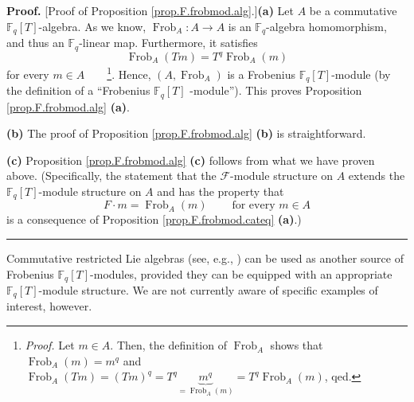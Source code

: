 \documentclass[numbers=enddot,12pt,final,onecolumn,notitlepage]{scrartcl}%
\theoremstyle{definition}
\newenvironment{proof}[1][Proof]{\noindent\textbf{#1.} }{\ \rule{0.5em}{0.5em}}
\begin{document}
\begin{proof}
[Proof of Proposition \ref{prop.F.frobmod.alg}.]\textbf{(a)} Let $A$ be a
commutative $\mathbb{F}_{q}\left[  T\right]  $-algebra. As we know,
$\operatorname*{Frob}\nolimits_{A}:A\rightarrow A$ is an $\mathbb{F}_{q}%
$-algebra homomorphism, and thus an $\mathbb{F}_{q}$-linear map. Furthermore,
it satisfies%
\[
\operatorname*{Frob}\nolimits_{A}\left(  Tm\right)  =T^{q}\operatorname*{Frob}%
\nolimits_{A}\left(  m\right)
\]
for every $m\in A$\ \ \ \ \footnote{\textit{Proof.} Let $m\in A$. Then, the
definition of $\operatorname*{Frob}\nolimits_{A}$ shows that
$\operatorname*{Frob}\nolimits_{A}\left(  m\right)  =m^{q}$ and
$\operatorname*{Frob}\nolimits_{A}\left(  Tm\right)  =\left(  Tm\right)
^{q}=T^{q}\underbrace{m^{q}}_{=\operatorname*{Frob}\nolimits_{A}\left(
m\right)  }=T^{q}\operatorname*{Frob}\nolimits_{A}\left(  m\right)  $, qed.}.
Hence, $\left(  A,\operatorname*{Frob}\nolimits_{A}\right)  $ is a Frobenius
$\mathbb{F}_{q}\left[  T\right]  $-module (by the definition of a
\textquotedblleft Frobenius $\mathbb{F}_{q}\left[  T\right]  $%
-module\textquotedblright). This proves Proposition \ref{prop.F.frobmod.alg}
\textbf{(a)}. \medskip

\textbf{(b)} The proof of Proposition \ref{prop.F.frobmod.alg} \textbf{(b)} is
straightforward. \medskip

\textbf{(c)} Proposition \ref{prop.F.frobmod.alg} \textbf{(c)} follows from
what we have proven above. (Specifically, the statement that the $\mathcal{F}%
$-module structure on $A$ extends the $\mathbb{F}_{q}\left[  T\right]
$-module structure on $A$ and has the property that
\[
F\cdot m=\operatorname*{Frob}\nolimits_{A}\left(  m\right)
\ \ \ \ \ \ \ \ \ \ \text{for every }m\in A
\]
is a consequence of Proposition \ref{prop.F.frobmod.cateq} \textbf{(a)}.)
\end{proof}

Commutative restricted Lie algebras (see, e.g., \cite{jacobson-rl}) can be
used as another source of Frobenius $\mathbb{F}_{q}\left[  T\right]
$-modules, provided they can be equipped with an appropriate $\mathbb{F}%
_{q}\left[  T\right]  $-module structure. We are not currently aware of
specific examples of interest, however.
\end{document}
